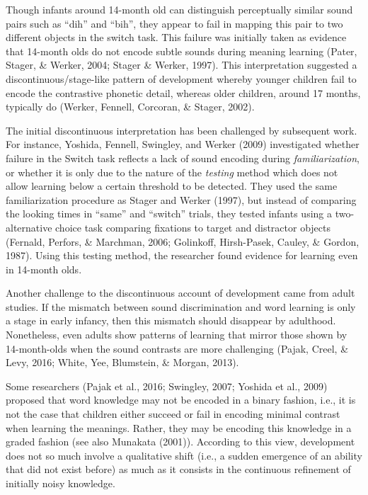 \documentclass[english,,man,floatsintext]{apa6}
\theoremstyle{definition}
\theoremstyle{definition}
\theoremstyle{definition}
\theoremstyle{remark}
\begin{document}
Though infants around 14-month old can distinguish perceptually similar
sound pairs such as \enquote{dih} and \enquote{bih}, they appear to fail
in mapping this pair to two different objects in the switch task. This
failure was initially taken as evidence that 14-month olds do not encode
subtle sounds during meaning learning (Pater, Stager, \& Werker, 2004;
Stager \& Werker, 1997). This interpretation suggested a
discontinuous/stage-like pattern of development whereby younger children
fail to encode the contrastive phonetic detail, whereas older children,
around 17 months, typically do (Werker, Fennell, Corcoran, \& Stager,
2002).

The initial discontinuous interpretation has been challenged by
subsequent work. For instance, Yoshida, Fennell, Swingley, and Werker
(2009) investigated whether failure in the Switch task reflects a lack
of sound encoding during \emph{familiarization}, or whether it is only
due to the nature of the \emph{testing} method which does not allow
learning below a certain threshold to be detected. They used the same
familiarization procedure as Stager and Werker (1997), but instead of
comparing the looking times in \enquote{same} and \enquote{switch}
trials, they tested infants using a two-alternative choice task
comparing fixations to target and distractor objects (Fernald, Perfors,
\& Marchman, 2006; Golinkoff, Hirsh-Pasek, Cauley, \& Gordon, 1987).
Using this testing method, the researcher found evidence for learning
even in 14-month olds.

Another challenge to the discontinuous account of development came from
adult studies. If the mismatch between sound discrimination and word
learning is only a stage in early infancy, then this mismatch should
disappear by adulthood. Nonetheless, even adults show patterns of
learning that mirror those shown by 14-month-olds when the sound
contrasts are more challenging (Pajak, Creel, \& Levy, 2016; White, Yee,
Blumstein, \& Morgan, 2013).

Some researchers (Pajak et al., 2016; Swingley, 2007; Yoshida et al.,
2009) proposed that word knowledge may not be encoded in a binary
fashion, i.e., it is not the case that children either succeed or fail
in encoding minimal contrast when learning the meanings. Rather, they
may be encoding this knowledge in a graded fashion (see also Munakata
(2001)). According to this view, development does not so much involve a
qualitative shift (i.e., a sudden emergence of an ability that did not
exist before) as much as it consists in the continuous refinement of
initially noisy knowledge.
\end{document}
